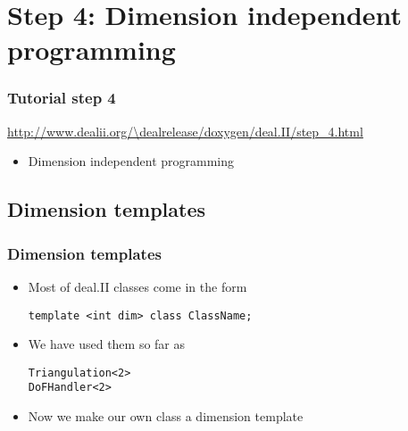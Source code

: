 
\section[Step4]{Step 4: Dimension independent programming}

\begin{frame}
  \frametitle{Tutorial step 4}
  {\footnotesize{\url{http://www.dealii.org/\dealrelease/doxygen/deal.II/step_4.html}}}
  \begin{itemize}
  \item Dimension independent programming
  \end{itemize}
\end{frame}

\subsection{Dimension templates}
\begin{frame}[fragile]
  \frametitle{Dimension templates}
  \begin{itemize}
  \item Most of deal.II classes come in the form
    \begin{block}{}
\begin{lstlisting}
template <int dim> class ClassName;
\end{lstlisting}      
    \end{block}
  \item We have used them so far as
    \begin{block}{}
\begin{lstlisting}
Triangulation<2>
DoFHandler<2>
\end{lstlisting}      
    \end{block}
  \item Now we make our own class a dimension template
  \end{itemize}
\end{frame}


